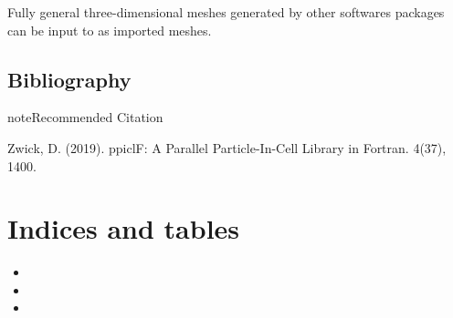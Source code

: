 \documentclass[letterpaper,10pt,english]{sphinxmanual}
\begin{document}
Fully general three-dimensional meshes generated by other softwares
packages can be input to  as imported meshes.


\section{Bibliography}
\label{\detokenize{bibliography:bibliography}}\label{\detokenize{bibliography::doc}}
\begin{sphinxadmonition}{note}{Recommended Citation}

Zwick, D. (2019). ppiclF: A Parallel Particle-In-Cell Library in Fortran.  4(37), 1400. 
\end{sphinxadmonition}


\chapter{Indices and tables}
\label{\detokenize{index:indices-and-tables}}\begin{itemize}
\item {} 

\item {} 

\item {} 

\end{itemize}
\end{document}
